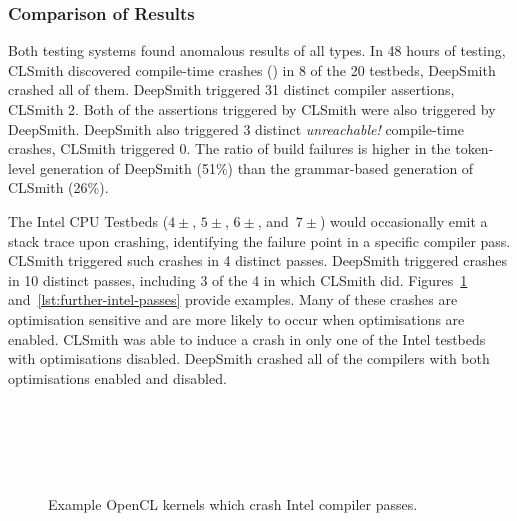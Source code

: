\subsubsection{Comparison of Results}

Both testing systems found anomalous results of all types. In 48 hours of testing, CLSmith discovered compile-time crashes (\bc) in 8 of the 20 testbeds, DeepSmith crashed all of them. DeepSmith triggered 31 distinct compiler assertions, CLSmith 2. Both of the assertions triggered by CLSmith were also triggered by DeepSmith. DeepSmith also triggered 3 distinct \emph{unreachable!} compile-time crashes, CLSmith triggered 0. The ratio of build failures is higher in the token-level generation of DeepSmith (51\%) than the grammar-based generation of CLSmith (26\%).

The Intel CPU Testbeds ($4\pm$, $5\pm$, $6\pm$, and~$7\pm$) would occasionally emit a stack trace upon crashing, identifying the failure point in a specific compiler pass. CLSmith triggered such crashes in 4 distinct passes. DeepSmith triggered crashes in 10 distinct passes, including 3 of the 4 in which CLSmith did. Figures~\ref{lst:intel-passes} and~\ref{lst:further-intel-passes} provide examples. Many of these crashes are optimisation sensitive and are more likely to occur when optimisations are enabled. CLSmith was able to induce a crash in only one of the Intel testbeds with optimisations disabled. DeepSmith crashed all of the compilers with both optimisations enabled and disabled.


\begin{figure}
  \centering
  \\%
  \\%
  \\%
  \\%
  \caption[Example kernels which crash Intel compiler passes]{%
    Example OpenCL kernels which crash Intel compiler passes.%
  }%
  \label{lst:intel-passes}
\end{figure}

